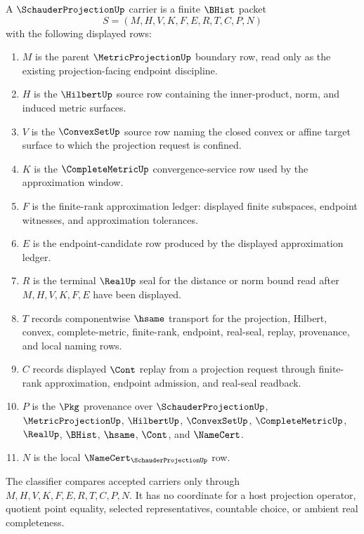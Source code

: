 \begin{definition}
\label{def:schauder-projection-carrier}
A $\SchauderProjectionUp$ carrier is a finite $\BHist$ packet
$$
S=(M,H,V,K,F,E,R,T,C,P,N)
$$
with the following displayed rows:
\begin{enumerate}
\item $M$ is the parent $\MetricProjectionUp$ boundary row, read only as the existing projection-facing endpoint discipline.
\item $H$ is the $\HilbertUp$ source row containing the inner-product, norm, and induced metric surfaces.
\item $V$ is the $\ConvexSetUp$ source row naming the closed convex or affine target surface to which the projection request is confined.
\item $K$ is the $\CompleteMetricUp$ convergence-service row used by the approximation window.
\item $F$ is the finite-rank approximation ledger: displayed finite subspaces, endpoint witnesses, and approximation tolerances.
\item $E$ is the endpoint-candidate row produced by the displayed approximation ledger.
\item $R$ is the terminal $\RealUp$ seal for the distance or norm bound read after $M,H,V,K,F,E$ have been displayed.
\item $T$ records componentwise $\hsame$ transport for the projection, Hilbert, convex, complete-metric, finite-rank, endpoint, real-seal, replay, provenance, and local naming rows.
\item $C$ records displayed $\Cont$ replay from a projection request through finite-rank approximation, endpoint admission, and real-seal readback.
\item $P$ is the $\Pkg$ provenance over $\SchauderProjectionUp$, $\MetricProjectionUp$, $\HilbertUp$, $\ConvexSetUp$, $\CompleteMetricUp$, $\RealUp$, $\BHist$, $\hsame$, $\Cont$, and $\NameCert$.
\item $N$ is the local $\NameCert_{\SchauderProjectionUp}$ row.
\end{enumerate}
The classifier compares accepted carriers only through $M,H,V,K,F,E,R,T,C,P,N$. It has no coordinate for a host projection operator, quotient point equality, selected representatives, countable choice, or ambient real completeness.
\end{definition}

